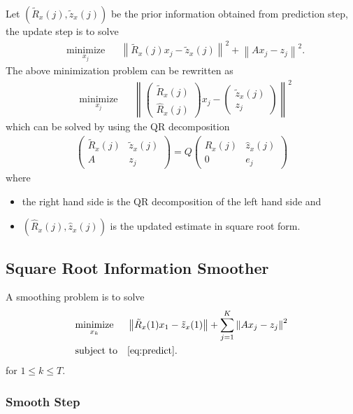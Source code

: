 \documentclass[microtype]{gtpart}     %
\theoremstyle{definition}
\newcommand{\norm}[1]{\left\lVert#1\right\rVert}
\begin{document}
Let $(\tilde{R}_x(j), \tilde{z}_x(j))$ be the prior information obtained from prediction step, 
the update step is to solve
\begin{align*}
	& \underset{x_j}{\text{minimize}} & &\norm{\tilde{R}_x(j)x_j - \tilde{z}_x(j)}^2 + \norm{Ax_j - z_j}^2.
\end{align*}
The above minimization problem can be rewritten as
\begin{align*}
	& \underset{x_j}{\text{minimize}} & &\norm{
	\begin{pmatrix}
	\tilde{R}_x(j) \\ \hat{R}_x(j)
	\end{pmatrix}x_j - 
	\begin{pmatrix}
	\tilde{z}_x(j) \\  z_j
	\end{pmatrix}}^2
\end{align*}
which can be solved by using the QR decomposition
\begin{align*}
	\begin{pmatrix}
		\tilde{R}_x(j) &\tilde{z}_x(j) \\ 
		A &z_j
	\end{pmatrix} = Q
	\begin{pmatrix}
		\hat{R}_x(j) &\hat{z}_x(j) \\
		0 &e_j
	\end{pmatrix}
\end{align*}
where
\begin{itemize}
	\item the right hand side is the QR decomposition of the left hand side and
	\item $(\hat{R}_x(j), \hat{z}_x(j))$ is the updated estimate in square root form.
\end{itemize}

\subsection{Square Root Information Smoother}

A smoothing problem is to solve
\begin{align*}
& \underset{x_k}{\text{minimize}} & & \norm{\tilde{R}_x(1)x_1 - \tilde{z}_x(1)} + \sum_{j=1}^{K}\norm{Ax_j - z_j}^2 \\
& \text{subject to} & & \autoref{eq:predict}.
\end{align*}
for $1\leq k \leq T$.

\subsubsection{Smooth Step}
\end{document}
